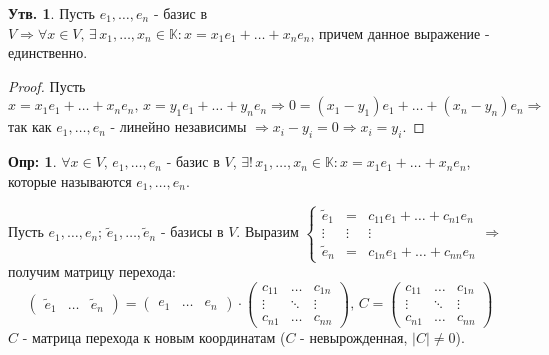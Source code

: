 \documentclass[12pt]{article}
\theoremstyle{definition}
\newtheorem{defn}{Опр:}
\newtheorem{prop}{Утв.}
\begin{document}
\begin{prop}
	Пусть $e_1, \dotsc, e_n$ - базис в $V \Rightarrow \forall x \in V,\, \exists \, x_1, \dotsc, x_n \in \mathbb{K}\colon x = x_1 e_1 + \dotsc + x_n e_n$, причем данное выражение - единственно.
\end{prop}
\begin{proof}
	Пусть $x = x_1 e_1 + \dotsc + x_n e_n, \, x = y_1 e_1 + \dotsc + y_n e_n \Rightarrow 0 = (x_1 - y_1)e_1 + \dotsc + (x_n - y_n)e_n \Rightarrow$ так как $e_1, \dotsc, e_n$ - линейно независимы $\Rightarrow x_i - y_i = 0 \Rightarrow x_i = y_i$.
\end{proof}
\begin{defn}
	$\forall x \in V, \, e_1, \dotsc, e_n$ - базис в $V$, $\exists! \, x_1, \dotsc, x_n \in \mathbb{K} \colon x = x_1 e_1 + \dotsc + x_n e_n$, которые называются  $e_1,\dotsc, e_n$.
\end{defn}

Пусть $e_1, \dotsc, e_n; \, \widetilde{e}_1, \dotsc, \widetilde{e}_n$ - базисы в $V$. Выразим $\left\{\begin{array}{ccc} \widetilde{e}_1 &=&c_{11}e_1 + \dotsc + c_{n1}e_n\\
\vdots&\vdots&\vdots \\
\widetilde{e}_n &=&c_{1n}e_1 + \dotsc + c_{nn}e_n
\end{array}	\right. \Rightarrow$ получим матрицу перехода:
$$
	\begin{pmatrix} 
		\widetilde{e}_1 & \dotsc & \widetilde{e}_n 
	\end{pmatrix} 
	= 
	\begin{pmatrix} 
		e_1 & \dotsc & e_n 
	\end{pmatrix}
	{\cdot} 
	\begin{pmatrix} 
		c_{11} & \dotsc & c_{1n}\\ 
		\vdots & \ddots & \vdots\\ 
		c_{n1} & \dotsc & c_{nn}
	 \end{pmatrix}, \, 
 	C = 
 	\begin{pmatrix} 
 		c_{11} & \dotsc & c_{1n}\\ 
 		\vdots & \ddots & \vdots \\ 
 		c_{n1} & \dotsc & c_{nn}
 	\end{pmatrix}
$$
$C$ - матрица перехода к новым координатам ($C$ - невырожденная, $|C| \neq 0$).
\end{document}
